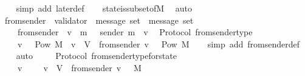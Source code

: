 \begin{isabellebody}
%
\isadelimproof
\ \ %
\endisadelimproof
%
\isatagproof
{}\isamarkupfalse%
\ {\isacharparenleft}simp\ add{\isacharcolon}\ later{\isacharunderscore}def{\isacharparenright}\isanewline
\ \ \isamarkupfalse%
\ state{\isacharunderscore}is{\isacharunderscore}subset{\isacharunderscore}of{\isacharunderscore}M\ \isamarkupfalse%
\ auto%
\endisatagproof
{\isafoldproof}%
%
\isadelimproof
\isanewline
%
\endisadelimproof
\isanewline
\isanewline
{}\isamarkupfalse%
\ from{\isacharunderscore}sender\ {\isacharcolon}{\isacharcolon}\ {\isachardoublequoteopen}{\isacharparenleft}validator\ {\isacharasterisk}\ message\ set{\isacharparenright}\ {\isasymRightarrow}\ message\ set{\isachardoublequoteclose}\isanewline
\ \ \isanewline
\ \ \ \ {\isachardoublequoteopen}from{\isacharunderscore}sender\ {\isacharequal}\ {\isacharparenleft}{\isasymlambda}{\isacharparenleft}v{\isacharcomma}\ {\isasymsigma}{\isacharparenright}{\isachardot}\ {\isacharbraceleft}m\ {\isasymin}\ {\isasymsigma}{\isachardot}\ sender\ m\ {\isacharequal}\ v{\isacharbraceright}{\isacharparenright}{\isachardoublequoteclose}\isanewline
\isanewline
{}\isamarkupfalse%
\ {\isacharparenleft}\ Protocol{\isacharparenright}\ from{\isacharunderscore}sender{\isacharunderscore}type\ {\isacharcolon}\isanewline
\ \ {\isachardoublequoteopen}{\isasymforall}\ {\isasymsigma}\ v{\isachardot}\ {\isasymsigma}\ {\isasymin}\ Pow\ M\ {\isasymand}\ v\ {\isasymin}\ V\ {\isasymlongrightarrow}\ from{\isacharunderscore}sender\ {\isacharparenleft}v{\isacharcomma}\ {\isasymsigma}{\isacharparenright}\ {\isasymin}\ Pow\ M{\isachardoublequoteclose}\isanewline
%
\isadelimproof
\ \ %
\endisadelimproof
%
\isatagproof
{}\isamarkupfalse%
\ {\isacharparenleft}simp\ add{\isacharcolon}\ from{\isacharunderscore}sender{\isacharunderscore}def{\isacharparenright}\isanewline
\ \ \isamarkupfalse%
\ auto%
\endisatagproof
{\isafoldproof}%
%
\isadelimproof
\ \ \isanewline
%
\endisadelimproof
\isanewline
{}\isamarkupfalse%
\ {\isacharparenleft}\ Protocol{\isacharparenright}\ from{\isacharunderscore}sender{\isacharunderscore}type{\isacharunderscore}for{\isacharunderscore}state\ {\isacharcolon}\isanewline
\ \ {\isachardoublequoteopen}{\isasymforall}\ {\isasymsigma}\ v{\isachardot}\ {\isasymsigma}\ {\isasymin}\ {\isasymSigma}\ {\isasymand}\ v\ {\isasymin}\ V\ {\isasymlongrightarrow}\ from{\isacharunderscore}sender\ {\isacharparenleft}v{\isacharcomma}\ {\isasymsigma}{\isacharparenright}\ {\isasymsubseteq}\ M{\isachardoublequoteclose}\isanewline

\end{isabellebody}

